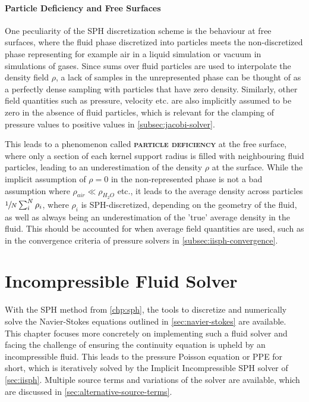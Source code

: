 \documentclass[oneside, a4paper]{book}
\newcommand\emphasis[1]{{\scshape\bfseries#1}}
\newcounter{phase}[algorithm]
\begin{document}
    \subsubsection{Particle Deficiency and Free Surfaces}\label{subsec:particle-deficiency}
    One peculiarity of the SPH discretization scheme is the behaviour at free surfaces, where the fluid phase discretized into particles meets the non-discretized phase representing for example air in a liquid simulation or vacuum in simulations of gases. Since sums over fluid particles are used to interpolate the density field $\rho$, a lack of samples in the unrepresented phase can be thought of as a perfectly dense sampling with particles that have zero density. Similarly, other field quantities such as pressure, velocity etc. are also implicitly assumed to be zero in the absence of fluid particles, which is relevant for the clamping of pressure values to positive values in \autoref{subsec:jacobi-solver}. 
    
    This leads to a phenomenon called \emphasis{particle deficiency} at the free surface, where only a section of each kernel support radius is filled with neighbouring fluid particles, leading to an underestimation of the density $\rho$ at the surface. While the implicit assumption of $\rho=0$ in the non-represented phase is not a bad assumption where $\rho_{air}\ll\rho_{H_2O}$ etc., it leads to the average density across particles $\sfrac{1}{N}\sum_i^N\rho_i$, where $\rho_i$ is SPH-discretized, depending on the geometry of the fluid, as well as always being an underestimation of the 'true' average density in the fluid. This should be accounted for when average field quantities are used, such as in the convergence criteria of pressure solvers in \autoref{subsec:iisph-convergence}.

    


\chapter{Incompressible Fluid Solver}\label{chp:fluid}
  With the SPH method from \autoref{chp:sph}, the tools to discretize and numerically solve the Navier-Stokes equations outlined in \autoref{sec:navier-stokes} are available. This chapter focuses more concretely on implementing such a fluid solver and facing the challenge of ensuring the continuity equation is upheld by an incompressible fluid. This leads to the pressure Poisson equation or PPE for short, which is iteratively solved by the Implicit Incompressible SPH solver of \autoref{sec:iisph}. Multiple source terms and variations of the solver are available, which are discussed in \autoref{sec:alternative-source-terms}.
\end{document}
